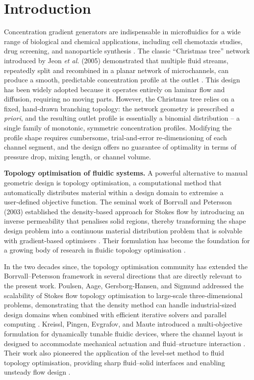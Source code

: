 \documentclass[12pt]{article}
\begin{document}
\section{Introduction}
\label{sec:intro}

Concentration gradient generators are indispensable in microfluidics for a wide range of biological and chemical applications, including cell chemotaxis studies, drug screening, and nanoparticle synthesis \cite{jeon2005}. The classic ``Christmas tree'' network introduced by Jeon \textit{et al.} (2005) demonstrated that multiple fluid streams, repeatedly split and recombined in a planar network of microchannels, can produce a smooth, predictable concentration profile at the outlet \cite{jeon2005}. This design has been widely adopted because it operates entirely on laminar flow and diffusion, requiring no moving parts. However, the Christmas tree relies on a fixed, hand‑drawn branching topology: the network geometry is prescribed \textit{a priori}, and the resulting outlet profile is essentially a binomial distribution – a single family of monotonic, symmetric concentration profiles. Modifying the profile shape requires cumbersome, trial‑and‑error re‑dimensioning of each channel segment, and the design offers no guarantee of optimality in terms of pressure drop, mixing length, or channel volume.

\textbf{Topology optimisation of fluidic systems.} A powerful alternative to manual geometric design is topology optimisation, a computational method that automatically distributes material within a design domain to extremise a user‑defined objective function. The seminal work of Borrvall and Petersson (2003) established the density‑based approach for Stokes flow by introducing an inverse permeability that penalises solid regions, thereby transforming the shape design problem into a continuous material distribution problem that is solvable with gradient‑based optimisers \cite{borrvall2003}. Their formulation has become the foundation for a growing body of research in fluidic topology optimisation \cite{gersborg2005, olesen2006, evgrafov2005, challis2009}.

In the two decades since, the topology optimisation community has extended the Borrvall–Petersson framework in several directions that are directly relevant to the present work. Poulsen, Aage, Gersborg‑Hansen, and Sigmund addressed the scalability of Stokes flow topology optimisation to large‑scale three‑dimensional problems, demonstrating that the density method can handle industrial‑sized design domains when combined with efficient iterative solvers and parallel computing \cite{aage2008, poulsen2003}. Kreissl, Pingen, Evgrafov, and Maute introduced a multi‑objective formulation for dynamically tunable fluidic devices, where the channel layout is designed to accommodate mechanical actuation and fluid–structure interaction \cite{kreissl2010, kreissl2011}. Their work also pioneered the application of the level‑set method to fluid topology optimisation, providing sharp fluid–solid interfaces and enabling unsteady flow design \cite{kreissl2012}.
\end{document}

